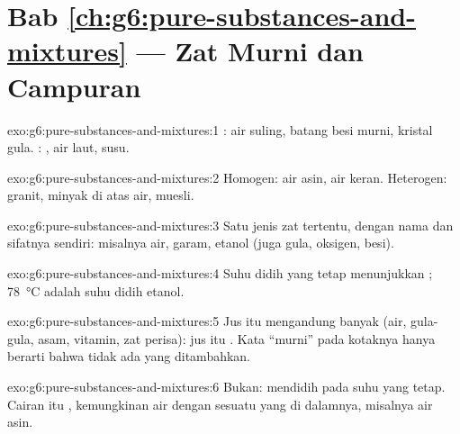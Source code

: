 \section*{Bab \ref{ch:g6:pure-substances-and-mixtures} --- Zat Murni dan Campuran}

\begin{solution}{exo:g6:pure-substances-and-mixtures:1}
: air suling, batang besi murni, kristal gula. :
, air laut, susu.
\end{solution}

\begin{solution}{exo:g6:pure-substances-and-mixtures:2}
Homogen: air asin, air keran. Heterogen: granit, minyak di atas air,
muesli.
\end{solution}

\begin{solution}{exo:g6:pure-substances-and-mixtures:3}
Satu jenis zat tertentu, dengan nama dan sifatnya sendiri: misalnya
air, garam, etanol (juga gula, oksigen, besi).
\end{solution}

\begin{solution}{exo:g6:pure-substances-and-mixtures:4}
Suhu didih yang tetap menunjukkan ; \qty{78}{\celsius} adalah
suhu didih etanol.
\end{solution}

\begin{solution}{exo:g6:pure-substances-and-mixtures:5}
Jus itu mengandung banyak  (air, gula-gula, asam, vitamin,
zat perisa): jus itu . Kata ``murni'' pada kotaknya hanya
berarti bahwa tidak ada yang ditambahkan.
\end{solution}

\begin{solution}{exo:g6:pure-substances-and-mixtures:6}
Bukan:  mendidih pada suhu yang tetap. Cairan itu ,
kemungkinan air dengan sesuatu yang  di dalamnya, misalnya air
asin.
\end{solution}


